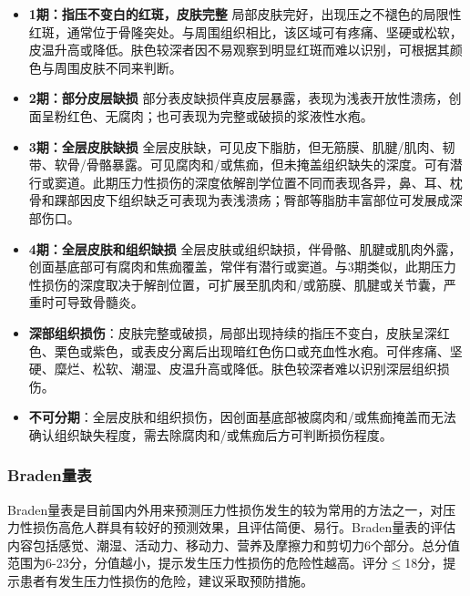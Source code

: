 \documentclass[11pt, a4paper]{ctexart}
\begin{document}
\begin{itemize}
	\item \textbf{1期：指压不变白的红斑，皮肤完整} 局部皮肤完好，出现压之不褪色的局限性红斑，通常位于骨隆突处。与周围组织相比，该区域可有疼痛、坚硬或松软，皮温升高或降低。肤色较深者因不易观察到明显红斑而难以识别，可根据其颜色与周围皮肤不同来判断。
	\item \textbf{2期：部分皮层缺损} 部分表皮缺损伴真皮层暴露，表现为浅表开放性溃疡，创面呈粉红色、无腐肉；也可表现为完整或破损的浆液性水疱。
	\item \textbf{3期：全层皮肤缺损} 全层皮肤缺，可见皮下脂肪，但无筋膜、肌腱/肌肉、韧带、软骨/骨骼暴露。可见腐肉和/或焦痂，但未掩盖组织缺失的深度。可有潜行或窦道。此期压力性损伤的深度依解剖学位置不同而表现各异，鼻、耳、枕骨和踝部因皮下组织缺乏可表现为表浅溃疡；臀部等脂肪丰富部位可发展成深部伤口。
	\item \textbf{4期：全层皮肤和组织缺损} 全层皮肤或组织缺损，伴骨骼、肌腱或肌肉外露，创面基底部可有腐肉和焦痂覆盖，常伴有潜行或窦道。与3期类似，此期压力性损伤的深度取决于解剖位置，可扩展至肌肉和/或筋膜、肌腱或关节囊，严重时可导致骨髓炎。
	\item \textbf{深部组织损伤}：皮肤完整或破损，局部出现持续的指压不变白，皮肤呈深红色、栗色或紫色，或表皮分离后出现暗红色伤口或充血性水疱。可伴疼痛、坚硬、糜烂、松软、潮湿、皮温升高或降低。肤色较深者难以识别深层组织损伤。
	\item \textbf{不可分期}：全层皮肤和组织损伤，因创面基底部被腐肉和/或焦痂掩盖而无法确认组织缺失程度，需去除腐肉和/或焦痂后方可判断损伤程度。
\end{itemize}

\subsubsection{Braden量表}
Braden量表是目前国内外用来预测压力性损伤发生的较为常用的方法之一，对压力性损伤高危人群具有较好的预测效果，且评估简便、易行。Braden量表的评估内容包括感觉、潮湿、活动力、移动力、营养及摩擦力和剪切力6个部分。总分值范围为6-23分，分值越小，提示发生压力性损伤的危险性越高。评分$\leq$18分，提示患者有发生压力性损伤的危险，建议采取预防措施。
\end{document}
